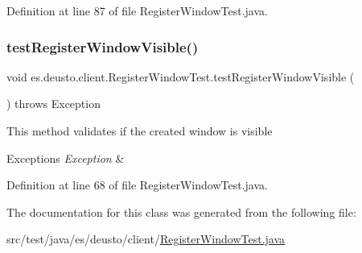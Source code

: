 Definition at line 87 of file Register\+Window\+Test.\+java.

\mbox{\label{classes_1_1deusto_1_1client_1_1_register_window_test_a7aa05237597943e612504c032609486e}} 
\subsubsection{\texorpdfstring{test\+Register\+Window\+Visible()}{testRegisterWindowVisible()}}
{\footnotesize\ttfamily void es.\+deusto.\+client.\+Register\+Window\+Test.\+test\+Register\+Window\+Visible (\begin{DoxyParamCaption}{ }\end{DoxyParamCaption}) throws Exception}

This method validates if the created window is visible


\begin{DoxyExceptions}{Exceptions}
{\em Exception} & \\
\hline
\end{DoxyExceptions}


Definition at line 68 of file Register\+Window\+Test.\+java.



The documentation for this class was generated from the following file\+:\begin{DoxyCompactItemize}
\item 
src/test/java/es/deusto/client/\hyperlink{_register_window_test_8java}{Register\+Window\+Test.\+java}\end{DoxyCompactItemize}
